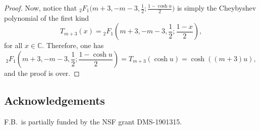 \documentclass[pdftex]{sigma}
\numberwithin{equation}{section}
\begin{document}
\begin{proof}
Now, notice that $_2 F_{1} \big(m+3,-m-3,\frac{1}{2};\frac{1-\cosh u }{2 }\big)$ is simply the Cheybyshev polynomial of the first kind
\begin{equation*}
T_{m+3}(x)={_2}F_{1} \left(m+3,-m-3,\frac{1}{2};\frac{1-x }{2 }\right),
\end{equation*}
for all $x\in \mathbb{C}$. Therefore, one has
\begin{equation*}
_2 F_{1} \left(m+3,-m-3,\frac{1}{2};\frac{1-\cosh u }{2 }\right)=T_{m+3}(\cosh u)=\cosh((m+3)u),
\end{equation*}
and the proof is over.
\end{proof}

\subsection*{Acknowledgements}
F.B.~is partially funded by the NSF grant DMS-1901315.
\end{document}
